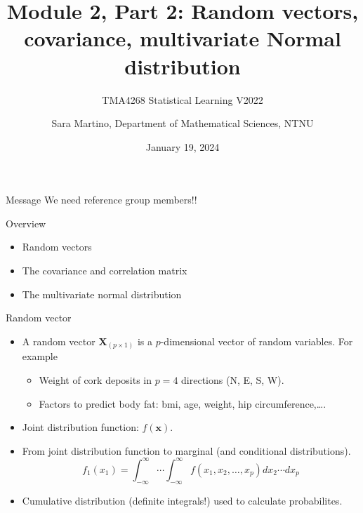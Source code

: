 \documentclass[
  ignorenonframetext,
]{beamer}
\title{Module 2, Part 2: Random vectors, covariance, multivariate Normal
distribution}
\subtitle{TMA4268 Statistical Learning V2022}
\author{Sara Martino, Department of Mathematical Sciences, NTNU}
\date{January 19, 2024}
\providecommand{\tightlist}{%
  \setlength{\itemsep}{0pt}\setlength{\parskip}{0pt}}
\begin{document}
\frame{\titlepage}

\begin{frame}{Message}
\protect\hypertarget{message}{}
We need reference group members!!
\end{frame}

\begin{frame}{Overview}
\protect\hypertarget{overview}{}
\normalsize

\begin{itemize}
\item
  Random vectors \vspace{2mm}
\item
  The covariance and correlation matrix \vspace{2mm}
\item
  The multivariate normal distribution
\end{itemize}
\end{frame}

\begin{frame}{Random vector}
\protect\hypertarget{random-vector}{}
\begin{itemize}
\tightlist
\item
  A random vector \(\boldsymbol{X}_{(p\times 1)}\) is a
  \(p\)-dimensional vector of random variables. For example

  \begin{itemize}
  \tightlist
  \item
    Weight of cork deposits in \(p=4\) directions (N, E, S, W).
  \item
    Factors to predict body fat: bmi, age, weight, hip
    circumference,\ldots.
  \end{itemize}
\item
  Joint distribution function: \(f(\boldsymbol{x})\).
\item
  From joint distribution function to marginal (and conditional
  distributions).
  \[f_1(x_1)=\int_{-\infty}^{\infty}\cdots \int_{-\infty}^{\infty} f(x_1,x_2,\ldots,x_p)dx_2 \cdots dx_p\]
\item
  Cumulative distribution (definite integrals!) used to calculate
  probabilites.
\end{itemize}
\end{frame}
\end{document}
